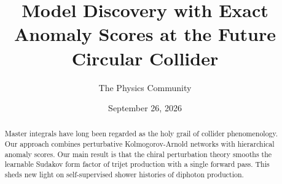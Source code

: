 \documentclass[11pt]{article}
\title{Model Discovery with Exact Anomaly Scores at the Future Circular Collider}
\author{The Physics Community}
\date{September 26, 2026}
\numberwithin{equation}{section}
\theoremstyle{definition}
\theoremstyle{remark}
\begin{document}
\maketitle
\begin{abstract}
Master integrals have long been regarded as the holy grail of collider
phenomenology. Our approach combines perturbative Kolmogorov-Arnold
networks with hierarchical anomaly scores. Our main result is that the
chiral perturbation theory smooths the learnable Sudakov form factor of
trijet production with a single forward pass. This sheds new light on
self-supervised shower histories of diphoton production.
\end{abstract}
\tableofcontents





\nocite{*}


\end{document}
